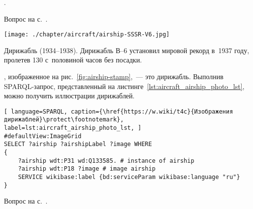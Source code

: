 \begin{task}
    \label{answer:aircraft_question_airship}
    . 
    
    \small{Вопрос на с.~\pageref{aircraft_question_4}.}
\end{task}


%
\begin{marginfigure}[3.2cm]
\centering\texttt{[image: ./chapter/aircraft/airship-SSSR-V6.jpg]}
\caption[Дирижабль СССР--В6 <<Осоавиахим>>.]{Дирижабль  (1934--1938). 
             Дирижабль В--6 установил мировой рекорд в~1937 году, 
             пролетев 130 с~половиной часов без посадки.\\
    }%
    \label{fig:airship-stamp}%
\end{marginfigure}
% 
\begin{task}
    \label{answer:aircraft_question_airship_2}
, изображенное на рис.~\ref{fig:airship-stamp},~--- это дирижабль. 
    Выполнив SPARQL-запрос, 
    представленный на листинге~\ref{lst:aircraft_airship_photo_lst}, 
    можно получить иллюстрации дирижаблей.
    
	\begin{lstlisting}[ language=SPARQL, caption={\href{https://w.wiki/t4c}{Изображения дирижаблей}\protect\footnotemark}, label=lst:aircraft_airship_photo_lst, ]
#defaultView:ImageGrid
SELECT ?airship ?airshipLabel ?image WHERE
{
    ?airship wdt:P31 wd:Q133585. # instance of airship
  	?airship wdt:P18 ?image # image airship
    SERVICE wikibase:label {bd:serviceParam wikibase:language "ru"}
}
\end{lstlisting}
    
\small{Вопрос на с.~\pageref{fig:airship_question_aircraft}.}
\end{task}


